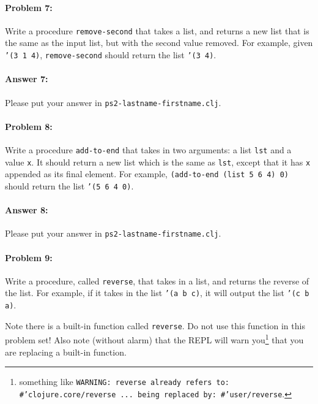 \documentclass[10pt]{article}
\newcommand{\PSnum}{2}
\begin{document}
\noindent\hrulefill %

\paragraph{Problem 7:}
Write a procedure \texttt{remove-second} that takes a list, and
returns a new list that is the same as the input list, but with 
the second value removed. For example, given \texttt{'(3 1 4)},
\texttt{remove-second} should return the list \texttt{'(3 4)}.

\paragraph{Answer 7:} Please put your answer in \texttt{ps\PSnum-lastname-firstname.clj}.

\noindent\hrulefill %

\paragraph{Problem 8:}
  Write a procedure \texttt{add-to-end} that takes in two arguments: a
  list \texttt{lst} and a value \texttt{x}. It should return a new list
  which is the same as \texttt{lst}, except that it has \texttt{x} appended as
  its final element. For example, \texttt{(add-to-end (list 5 6 4) 0)}
  should return the list \texttt{'(5 6 4 0)}.

\paragraph{Answer 8:} Please put your answer in \texttt{ps\PSnum-lastname-firstname.clj}.

\noindent\hrulefill %

\paragraph{Problem 9:}
  Write a procedure, called \texttt{reverse}, that takes in a list, and returns
  the reverse of the list. For example, if it takes in the list \texttt{'(a b c)}, it will output the list \texttt{'(c b a)}.

  Note there is a built-in function called \texttt{reverse}.  Do not use this function in this problem set!  Also note (without alarm) that the REPL will warn you\footnote{something like \texttt{WARNING: reverse already refers to: #'clojure.core/reverse ... being replaced by: #'user/reverse}.} that you are replacing a built-in function.
\end{document}
